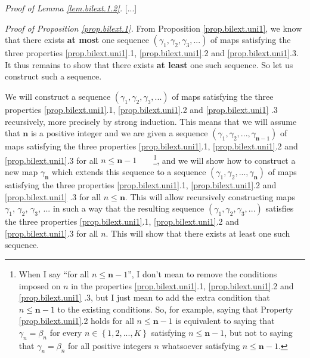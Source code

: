 \documentclass[etingof-lie.tex]{subfiles}
\begin{document}
\begin{noncompile}
\begin{lemma}
[...]
\end{lemma}

\textit{Proof of Lemma \ref{lem.bilext.1.2}.} [...]

\textit{Proof of Proposition \ref{prop.bilext.1}.} From Proposition
\ref{prop.bilext.uni1}, we know that there exists \textbf{at most} one
sequence $\left(  \gamma_{1},\gamma_{2},\gamma_{3},...\right)  $ of maps
satisfying the three properties \ref{prop.bilext.uni1}.1,
\ref{prop.bilext.uni1}.2 and \ref{prop.bilext.uni1}.3. It thus remains to show
that there exists \textbf{at least} one such sequence. So let us construct
such a sequence.

We will construct a sequence $\left(  \gamma_{1},\gamma_{2},\gamma
_{3},...\right)  $ of maps satisfying the three properties
\ref{prop.bilext.uni1}.1, \ref{prop.bilext.uni1}.2 and \ref{prop.bilext.uni1}%
.3 recursively, more precisely by strong induction. This means that we will
assume that $\mathbf{n}$ is a positive integer and we are given a sequence
$\left(  \gamma_{1},\gamma_{2},...,\gamma_{\mathbf{n}-1}\right)  $ of maps
satisfying the three properties \ref{prop.bilext.uni1}.1,
\ref{prop.bilext.uni1}.2 and \ref{prop.bilext.uni1}.3 for all $n\leq
\mathbf{n}-1$\ \ \ \ \footnote{When I say ``for all $n\leq\mathbf{n}-1$'', I
don't mean to remove the conditions imposed on $n$ in the properties
\ref{prop.bilext.uni1}.1, \ref{prop.bilext.uni1}.2 and \ref{prop.bilext.uni1}%
.3, but I just mean to add the extra condition that $n\leq\mathbf{n}-1$ to the
existing conditions. So, for example, saying that Property
\ref{prop.bilext.uni1}.2 holds for all $n\leq\mathbf{n}-1$ is equivalent to
saying that $\gamma_{n}=\beta_{n}$ for every $n\in\left\{  1,2,...,K\right\}
$ satisfying $n\leq\mathbf{n}-1$, but not to saying that $\gamma_{n}=\beta
_{n}$ for all positive integers $n$ whatsoever satisfying $n\leq\mathbf{n}%
-1$.}, and we will show how to construct a new map $\gamma_{\mathbf{n}}$ which
extends this sequence to a sequence $\left(  \gamma_{1},\gamma_{2}%
,...,\gamma_{\mathbf{n}}\right)  $ of maps satisfying the three properties
\ref{prop.bilext.uni1}.1, \ref{prop.bilext.uni1}.2 and \ref{prop.bilext.uni1}%
.3 for all $n\leq\mathbf{n}$. This will allow recursively constructing maps
$\gamma_{1}$, $\gamma_{2}$, $\gamma_{3}$, $...$ in such a way that the
resulting sequence $\left(  \gamma_{1},\gamma_{2},\gamma_{3},...\right)  $
satisfies the three properties \ref{prop.bilext.uni1}.1,
\ref{prop.bilext.uni1}.2 and \ref{prop.bilext.uni1}.3 for all $n$. This will
show that there exists at least one such sequence.


\end{noncompile}
\end{document}
